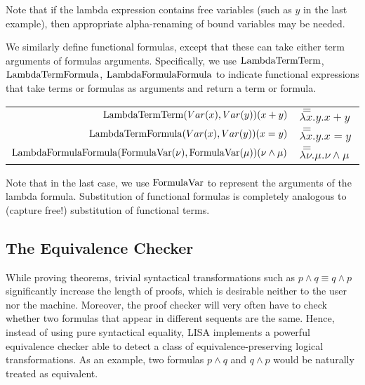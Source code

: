 Note that if the lambda expression contains free variables (such as $y$ in the last example), then appropriate alpha-renaming of bound variables may be needed.

We similarly define functional formulas, except that these can take either term arguments of formulas arguments. Specifically, we use $\operatorname{LambdaTermTerm}$, $\operatorname{LambdaTermFormula}$, $\operatorname{LambdaFormulaFormula}$ to indicate functional expressions that take terms or formulas as arguments and return a term or formula.

\begin{ex}
  \begin{center}
    \begin{tabular}{|r l|}
      \hline
      \rule{0em}{1.3em}
      $\operatorname{LambdaTermTerm}(Var(x), Var(y))(x+y)$                               & $=$ $\lambda x.y. x+y$               \\
      $\operatorname{LambdaTermFormula}(Var(x), Var(y))(x=y)$                               & $=$ $\lambda x.y. x=y$               \\
      $\operatorname{LambdaFormulaFormula}(\operatorname{FormulaVar}(\nu), \operatorname{FormulaVar}(\mu))(\nu \land \mu)$ & $=$ $\lambda \nu.\mu. \nu \land \mu$
      \rule[-1em]{0em}{0em}                                                                                 \\
      \hline
    \end{tabular}
  \end{center}

\end{ex}

Note that in the last case, we use $\operatorname{FormulaVar}$ to represent the arguments of the lambda formula. Substitution of functional formulas is completely analogous to (capture free!) substitution of functional terms.

\subsection{The Equivalence Checker}
\label{subsec:equivalencechecker}

While proving theorems, trivial syntactical transformations such as $p\land q \equiv q\land p$ significantly increase the length of proofs, which is desirable neither to the user nor the machine. Moreover, the proof checker will very often have to check whether two formulas that appear in different sequents are the same. Hence, instead of using pure syntactical equality, LISA implements a powerful equivalence checker able to detect a class of equivalence-preserving logical transformations. As an example, two formulas $p\land q$ and $q\land p$ would be naturally treated as equivalent.

